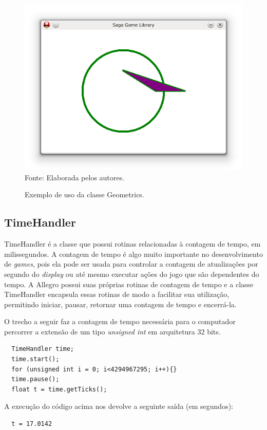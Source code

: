 \begin{figure}[H]
    \centering
    \caption{Exemplo de uso da classe Geometrics.}
    \label{ExemploGeometric}
    \includegraphics[scale = 0.7]{Imagens/ExemploGeometric.png}
    \\Fonte: Elaborada pelos autores.
\end{figure}
%
%
\subsection{TimeHandler}
%
%
TimeHandler é a classe que possui rotinas relacionadas à contagem de tempo, em milissegundos. A contagem de tempo é algo muito importante no desenvolvimento de \textit{games}, pois ela pode ser usada para controlar a contagem de atualizações por segundo do \textit{display} ou até mesmo executar ações do jogo que são dependentes do tempo. A Allegro possui suas próprias rotinas de contagem de tempo e a classe TimeHandler encapsula essas rotinas de modo a facilitar sua utilização, permitindo iniciar, pausar, retornar uma
contagem de tempo e encerrá-la.
\par
O trecho a seguir faz a contagem de tempo necessária para o computador percorrer a extensão de um tipo \textit{unsigned int} em arquitetura 32 bits.
%
\begin{lstlisting}
  TimeHandler time;
  time.start();
  for (unsigned int i = 0; i<4294967295; i++){} 
  time.pause();
  float t = time.getTicks();
\end{lstlisting}
%
\par 
A execução do código acima nos devolve a seguinte saída (em segundos): 
%
\begin{lstlisting}
  t = 17.0142
\end{lstlisting}
%
